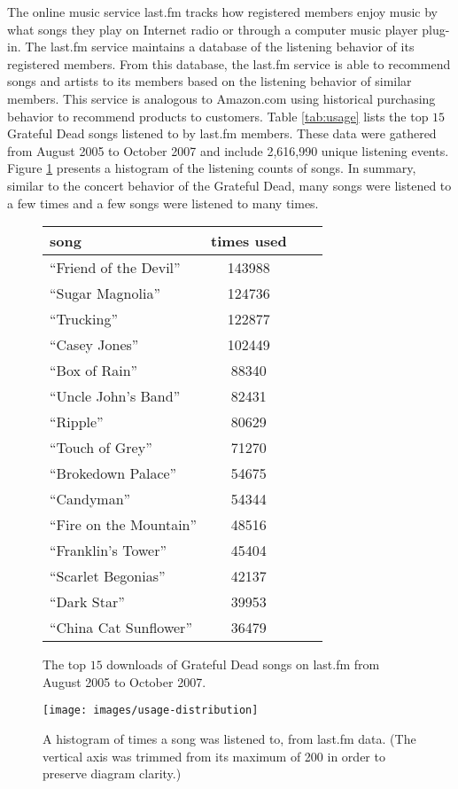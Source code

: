 \documentclass{svmult}
\newcommand{\ttt}[1]{``#1''}
\begin{document}
The online music service last.fm tracks how registered members enjoy music by what songs they play on Internet radio or through a computer music player plug-in.  The last.fm service maintains a database of the listening behavior of its registered members. From this database, the last.fm service is able to recommend songs and artists to its members based on the listening behavior of similar members.  This service is analogous to Amazon.com using historical purchasing behavior to recommend products to customers. Table \ref{tab:usage} lists the top $15$ Grateful Dead songs listened to by last.fm members. These data were gathered from August 2005 to October 2007 and include 2,616,990 unique listening events.  Figure \ref{fig:usage-distribution} presents a histogram of the listening counts of songs. In summary, similar to the concert behavior of the Grateful Dead, many songs were listened to a few times and a few songs were listened to many times.
\begin{figure}
    \begin{minipage}{2.75in}\begin{center}
\begin{footnotesize}
\begin{tabular}{lcll|}
\hline
\textbf{song}&\textbf{times used}\\\hline
\ttt{Friend of the Devil}&143988\\
\ttt{Sugar Magnolia}&124736\\
\ttt{Trucking}&122877\\
\ttt{Casey Jones}&102449\\
\ttt{Box of Rain}&88340\\
\ttt{Uncle John's Band}&82431\\
\ttt{Ripple}&80629\\
\ttt{Touch of Grey}&71270\\
\ttt{Brokedown Palace}&54675\\
\ttt{Candyman}&54344\\
\ttt{Fire on the Mountain}&48516\\
\ttt{Franklin's Tower}&45404\\
\ttt{Scarlet Begonias}&42137\\
\ttt{Dark Star}&39953\\
\ttt{China Cat Sunflower}&36479\\
\hline
\end{tabular}
\caption{\label{tab:usage}The top $15$ downloads of Grateful Dead songs on last.fm from August 2005 to October 2007.}
\end{footnotesize}
\end{center}
\end{minipage}
\qquad
\begin{minipage}{2.75in}\begin{center}
\texttt{[image: images/usage-distribution]}
\caption{\label{fig:usage-distribution}A histogram of times a song was listened to, from last.fm data. (The vertical axis was trimmed from its maximum of 200 in order to preserve diagram clarity.)}
\end{center}
\end{minipage}
\end{figure}
\end{document}
